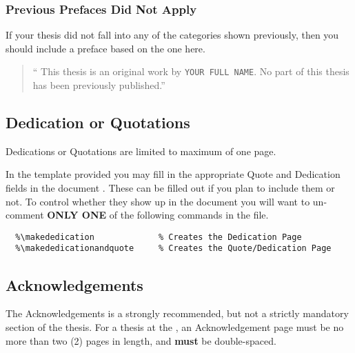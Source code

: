 			\subsubsection{Previous Prefaces Did Not Apply}\label{preface:DNA}
				If your thesis did not fall into any of the categories shown previously, then you should include a preface based on the one here.
				

				\begin{quote}
					\enquote{%
						This thesis is an original work by \texttt{YOUR FULL NAME}. 
						No part of this thesis has been previously published.}
				\end{quote}

		\subsection{Dedication or Quotations}\label{quote}\label{dedication}
			Dedications or Quotations are limited to maximum of one page.
			
			In the template provided you may fill in the appropriate Quote and Dedication fields in the document .
			These can be filled out if you plan to include them or not.
			To control whether they show up in the document you will want to un-comment \textbf{ONLY ONE} of the following commands in the  file.

			\begin{lstlisting}[float=ht,caption=Quote and Dedication Inclusion Options (un-comment only one),label=lst:QuotesAndDedication,style=LaTeXStyle,basicstyle=\scriptsize\ttfamily,]
  %\makequote                  % Creates the Quote Page
  %\makededication             % Creates the Dedication Page
  %\makededicationandquote     % Creates the Quote/Dedication Page
			\end{lstlisting}

		\subsection{Acknowledgements}\label{acknowledgement}
			The Acknowledgements is a strongly recommended, but not a strictly mandatory section of the thesis.
			For a thesis at the \University, an Acknowledgement page must be no more than two (2) pages in length, and \textbf{must} be double-spaced.
	
